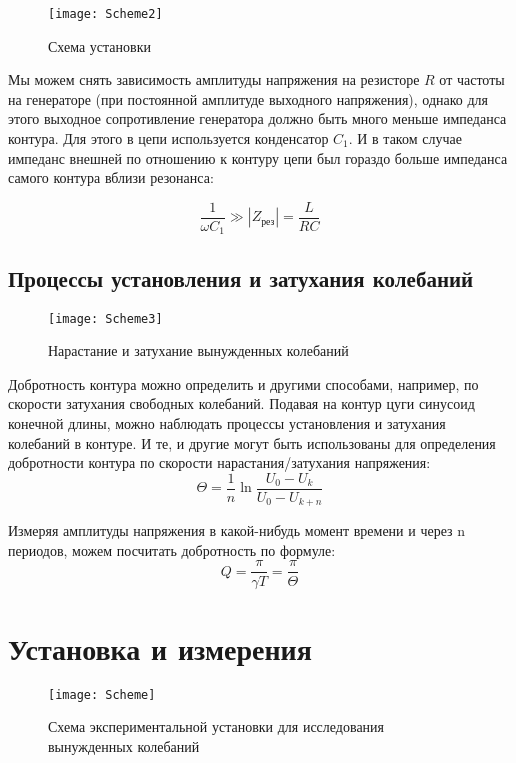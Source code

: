 \documentclass{lab}
\begin{document}
\begin{wrapfigure}[10]{l}{6cm}
	\texttt{[image: Scheme2]}
	\caption{\footnotesize Схема установки}
	\label{scheme1}
\end{wrapfigure}

Мы можем снять зависимость амплитуды напряжения на резисторе $R$ от частоты на генераторе
(при постоянной амплитуде выходного напряжения), однако для этого выходное сопротивление
генератора должно быть много меньше импеданса контура. Для этого в цепи используется
конденсатор $C_1$. И в таком случае импеданс внешней по отношению к контуру цепи был
гораздо больше импеданса самого контура вблизи резонанса:

$$\dfrac{1}{\omega C_1} \gg |Z_\text{рез}| = \dfrac{L}{RC} $$

\newpage

\subsection*{Процессы установления и затухания колебаний}

\begin{wrapfigure}[12]{l}{7cm}
	\texttt{[image: Scheme3]}
	\caption{\footnotesize Нарастание и затухание вынужденных колебаний}
\end{wrapfigure} 

Добротность контура можно определить и другими способами, например, по скорости затухания
свободных колебаний. Подавая на контур цуги синусоид конечной длины, можно наблюдать
процессы установления и затухания колебаний в контуре. И те, и другие могут быть
использованы для определения добротности контура по скорости нарастания/затухания
напряжения:\\

$$\Theta = \dfrac{1}{n} \ln \dfrac{U_0 - U_k}{U_0-U_{k+n}} $$

Измеряя амплитуды напряжения в какой-нибудь момент времени и через n периодов, можем
посчитать добротность по формуле:
$$Q = \dfrac{\pi}{\gamma T} = \dfrac{\pi}{\Theta}$$

\section*{Установка и измерения}

\begin{figure}[!h]
	\texttt{[image: Scheme]}
	\caption{\footnotesize Схема экспериментальной установки для исследования вынужденных
		колебаний}
\end{figure}
\end{document}
